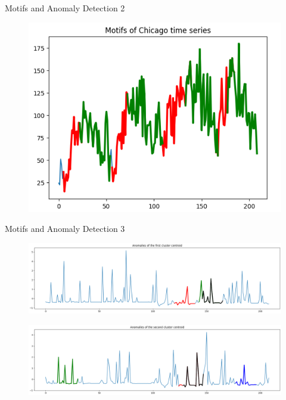 
\begin{frame}{Motifs and Anomaly Detection 2}

    \begin{figure}
        \centering
        \includegraphics[width=.8\textwidth]{img/ts/ChicagoMotifs.png}
      
        \label{CHGMOT}
    \end{figure}
    
    
        
\end{frame}




\begin{frame}{Motifs and Anomaly Detection 3}

    \begin{figure}
        \centering
        \includegraphics[width=.99\textwidth]{img/ts/Anom1.png}
      
        \label{ANOM1}
    \end{figure}
    
    \begin{figure}
        \centering
        \includegraphics[width=.99\textwidth]{img/ts/Anom2.png}
      
        \label{ANOM2}
    \end{figure}
    
    
        
\end{frame}


